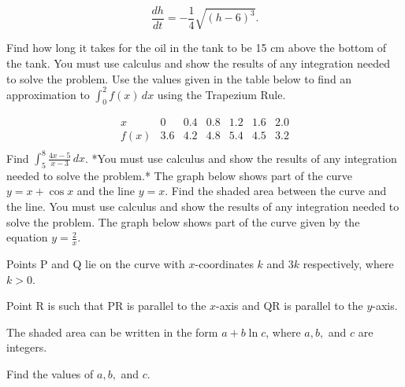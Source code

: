 \documentclass[12pt,addpoints]{exam}
\begin{document}
\begin{questions}
\[ 
\frac{dh}{dt} = -\frac{1}{4} \sqrt{(h-6)^3}. 
\]

Find how long it takes for the oil in the tank to be 15 cm above the bottom of the tank. You must use calculus and show the results of any integration needed to solve the problem.
\fillwithlines{5cm}
\question[5] Use the values given in the table below to find an approximation to \(\int_0^2 f(x) \, dx\) using the Trapezium Rule.

\[
\begin{array}{c|cccccc}
x & 0 & 0.4 & 0.8 & 1.2 & 1.6 & 2.0 \\
\hline
f(x) & 3.6 & 4.2 & 4.8 & 5.4 & 4.5 & 3.2 \\
\end{array}
\]
\fillwithlines{5cm}
\question[5] Find \(\int_5^8 \frac{4x-5}{x-3} \, dx\). *You must use calculus and show the results of any integration needed to solve the problem.*
\fillwithlines{5cm}
\question[5] The graph below shows part of the curve \( y = x + \cos x \) and the line \( y = x \). Find the shaded area between the curve and the line. You must use calculus and show the results of any integration needed to solve the problem.
\fillwithlines{5cm}
\question[5] The graph below shows part of the curve given by the equation \( y = \frac{2}{x} \).

Points P and Q lie on the curve with \( x \)-coordinates \( k \) and \( 3k \) respectively, where \( k > 0 \).

Point R is such that PR is parallel to the \( x \)-axis and QR is parallel to the \( y \)-axis.

The shaded area can be written in the form \( a + b \ln c \), where \( a, b, \) and \( c \) are integers.

Find the values of \( a, b, \) and \( c \).


\end{questions}
\end{document}
